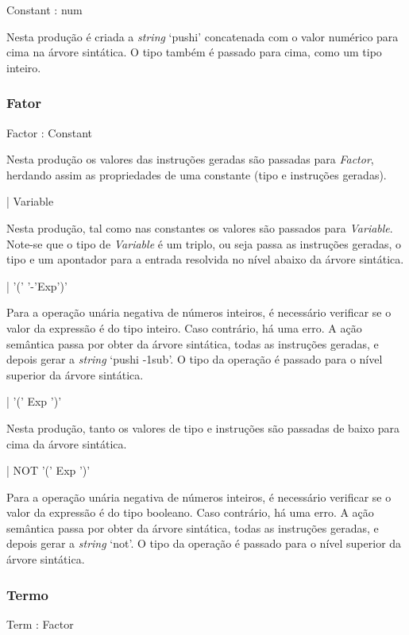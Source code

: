 Constant : num 

Nesta produção é criada a \emph{string} `pushi' concatenada com o valor numérico
para cima na árvore  sintática. O tipo também é passado para cima, como um tipo
inteiro.



\subsubsection{Fator} 

Factor : Constant              

Nesta produção os valores das instruções geradas são passadas para
\emph{Factor}, herdando assim as propriedades de uma constante (tipo
e instruções geradas).


| Variable

Nesta produção, tal como nas constantes os valores são passados para
\emph{Variable}. Note-se que o tipo de \emph{Variable} é um triplo, ou seja
passa as instruções geradas, o tipo e um apontador para a entrada resolvida no
nível abaixo da árvore sintática.  
 
| '('  '-'Exp')'               

Para a operação unária negativa de números inteiros, é necessário verificar se
o valor da expressão é do tipo inteiro. Caso contrário, há uma erro. A ação
semântica passa por obter da árvore sintática, todas as instruções geradas,
e depois gerar a \emph{string} `pushi -1sub'. O tipo da operação é passado
para o nível superior da árvore sintática.

| '(' Exp ')'                

Nesta produção, tanto os valores de tipo e instruções são passadas de baixo para
cima da árvore sintática.

                         
| NOT '(' Exp ')'            


Para a operação unária negativa de números inteiros, é necessário verificar se
o valor da expressão é do tipo booleano. Caso contrário, há uma erro. A ação
semântica passa por obter da árvore sintática, todas as instruções geradas,
e depois gerar a \emph{string} `not'. O tipo da operação é passado
para o nível superior da árvore sintática.
     


\subsubsection{Termo} 


Term : Factor            


